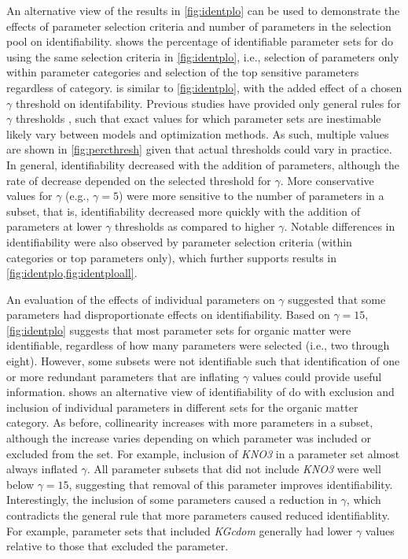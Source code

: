 \documentclass[letterpaper,12pt,oneside]{article}\usepackage[]{graphicx}\usepackage[]{color}
\begin{document}
An alternative view of the results in \cref{fig:identplo} can be used to demonstrate the effects of parameter selection criteria and number of parameters in the selection pool on identifiability.   shows the percentage of identifiable parameter sets for \ac{do} using the same selection criteria in \cref{fig:identplo}, i.e., selection of parameters only within parameter categories and selection of the top sensitive parameters regardless of category.   is similar to \cref{fig:identplo}, with the added effect of a chosen $\gamma$ threshold on identifability.  Previous studies have provided only general rules for $\gamma$ thresholds \citep{Brun01,Omlin01}, such that exact values for which parameter sets are inestimable likely vary between models and optimization methods.  As such, multiple values are shown in \cref{fig:percthresh}  given that actual thresholds could vary in practice. In general, identifiability decreased with the addition of parameters, although the rate of decrease depended on the selected threshold for $\gamma$. More conservative values for $\gamma$ (e.g., $\gamma = 5$) were more sensitive to the number of parameters in a subset, that is, identifiability decreased more quickly with the addition of parameters at lower $\gamma$ thresholds as compared to higher $\gamma$.  Notable differences in identifiability were also observed by parameter selection criteria (within categories or top parameters only), which further supports results in \cref{fig:identplo,fig:identploall}.    



An evaluation of the effects of individual parameters on $\gamma$ suggested that some parameters had disproportionate effects on identifiability.  Based on $\gamma = 15$, \cref{fig:identplo} suggests that most parameter sets for organic matter were identifiable, regardless of how many parameters were selected (i.e., two through eight).  However, some subsets were not identifiable such that identification of one or more redundant parameters that are inflating $\gamma$ values could provide useful information.   shows an alternative view of identifiability of \ac{do} with exclusion and inclusion of individual parameters in different sets for the organic matter category.  As before, collinearity increases with more parameters in a subset, although the increase varies depending on which parameter was included or excluded from the set.  For example, inclusion of \textit{KNO3} in a parameter set almost always inflated $\gamma$.  All parameter subsets that did not include \textit{KNO3} were well below $\gamma = 15$, suggesting that removal of this parameter improves identifiability.  Interestingly, the inclusion of some parameters caused a reduction in $\gamma$, which contradicts the general rule that more parameters caused reduced identifiablity.  For example, parameter sets that included \textit{KGcdom} generally had lower $\gamma$ values relative to those that excluded the parameter.
\end{document}
